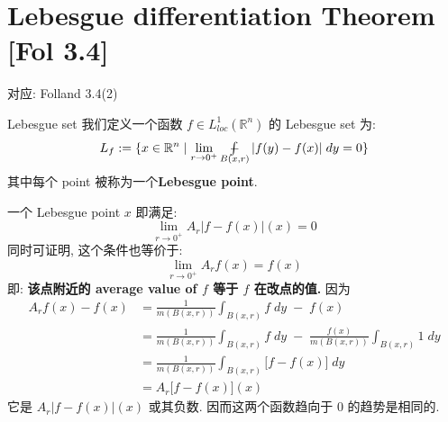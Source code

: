 \documentclass[lang=cn,11pt]{elegantbook}
\newcommand*{\avint}{\mathop{\ooalign{$\int$\cr$-$}}}
\begin{document}
\chapter{Lebesgue differentiation Theorem [Fol 3.4]}
对应: Folland 3.4(2)
\begin{definition}{Lebesgue set}
    我们定义一个函数 $f\in L^1_{loc}(\mathbb{R}^n)$ 的 Lebesgue set 为: \[
L_f := \{ x \in \mathbb{R}^n \mid \lim_{r \to 0^+} \avint_{B(x,r)} |f(y) - f(x) | \; dy = 0   \}
\]
其中每个 point 被称为一个\textbf{Lebesgue point}.
\end{definition}
\begin{remark}
    一个 Lebesgue point $x$ 即满足: \[
\lim_{r\to 0^+} A_r |f- f(x)| (x)  = 0
\]
同时可证明, 这个条件也等价于: \[
\lim_{r\to 0^+} A_rf(x)= f(x) 
\]
即: \textbf{该点附近的 average value of $f$ 等于 $f$ 在改点的值. }
因为 \begin{align}
    A_rf(x)-  f(x)  &= \frac{1}{m(B(x,r))} \int_{B(x,r)} f  \; dy\; -  \; f(x)  \\
    & = \frac{1}{m(B(x,r))} \int_{B(x,r)} f\;dy  \; -  \;   \frac{f(x)}{ m(B(x,r)) }\int_{B(x,r)} 1 \;dy\\
    & = \frac{1}{m(B(x,r))} \int_{B(x,r)}\big[ f  - f(x) \big]\; dy\\
    & = A_r \big[ f-f(x) \big] (x)
\end{align}
它是 $A_r |f- f(x)| (x) $ 或其负数. 因而这两个函数趋向于 0 的趋势是相同的.
\end{remark}
\end{document}

